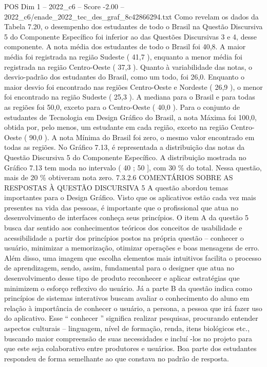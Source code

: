 \begin{textsample}{POS Dim 1 – 2022\_c6 – Score -2.00 – 2022\_c6/enade\_2022\_tec\_des\_graf\_8c42866294.txt}
Como revelam os dados da Tabela 7.20, o desempenho dos estudantes de todo o Brasil na Questão Discursiva 5 do Componente Específico foi inferior ao das Questões Discursivas 3 e 4, desse componente.
A nota média dos estudantes de todo o Brasil foi 40,8.
A maior média foi registrada na região Sudeste ( 41,7 ), enquanto a menor média foi registrada na região Centro-Oeste ( 37,3 ).
Quanto à variabilidade das notas, o desvio-padrão dos estudantes do Brasil, como um todo, foi 26,0.
Enquanto o maior desvio foi encontrado nas regiões Centro-Oeste e Nordeste ( 26,9 ), o menor foi encontrado na região Sudeste ( 25,3 ).
A mediana para o Brasil e para todas as regiões foi 50,0, exceto para o Centro-Oeste ( 40,0 ).
Para o conjunto de estudantes de Tecnologia em Design Gráfico do Brasil, a nota Máxima foi 100,0, obtida por, pelo menos, um estudante em cada região, exceto na região Centro-Oeste ( 90,0 ).
A nota Mínima do Brasil foi zero, o mesmo valor encontrado em todas as regiões.
No Gráfico 7.13, é representada a distribuição das notas da Questão Discursiva 5 do Componente Específico.
A distribuição mostrada no Gráfico 7.13 tem moda no intervalo ( 40 ; 50 ], com 30 \% do total.
Nessa questão, mais de 20 \% obtiveram nota zero. 7.3.2.6 COMENTÁRIOS SOBRE AS RESPOSTAS À QUESTÃO DISCURSIVA 5 A questão abordou temas importantes para o Design Gráfico.
Visto que os aplicativos estão cada vez mais presentes na vida das pessoas, é importante que o profissional que atua no desenvolvimento de interfaces conheça seus princípios.
O item A da questão 5 busca dar sentido aos conhecimentos teóricos dos conceitos de usabilidade e acessibilidade a partir dos princípios postos na própria questão – conhecer o usuário, minimizar a memorização, otimizar operações e boas mensagens de erro.
Além disso, uma imagem que escolha elementos mais intuitivos facilita o processo de aprendizagem, sendo, assim, fundamental para o designer que atua no desenvolvimento desse tipo de produto reconhecer e aplicar estratégias que minimizem o esforço reflexivo do usuário.
Já a parte B da questão indica como princípios de sistemas interativos buscam avaliar o conhecimento do aluno em relação à importância de conhecer o usuário, a persona, a pessoa que irá fazer uso do aplicativo.
Esse “ conhecer ” significa realizar pesquisas, procurando entender aspectos culturais – linguagem, nível de formação, renda, itens biológicos etc., buscando maior compreensão de suas necessidades e incluí -los no projeto para que este seja colaborativo entre produtores e usuários.
Boa parte dos estudantes respondeu de forma semelhante ao que constava no padrão de resposta.

\end{textsample}
